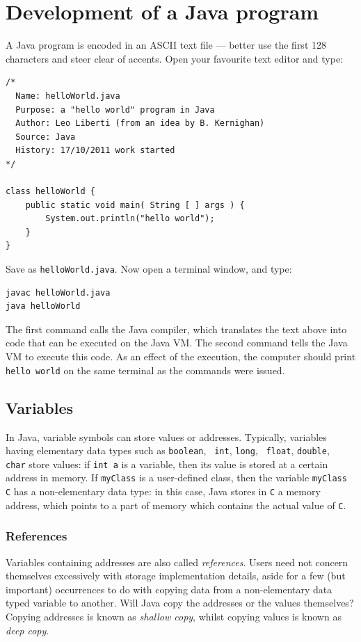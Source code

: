 \documentclass[a4paper]{book}
\theoremstyle{changebreak}                %
\begin{document}
\section{Development of a Java program}
\label{s:java:example}
A Java program is encoded in an ASCII text file ---
better use the first 128 characters and steer clear of accents. Open
your favourite text editor and type:
\begin{verbatim}
/*
  Name: helloWorld.java
  Purpose: a "hello world" program in Java
  Author: Leo Liberti (from an idea by B. Kernighan)
  Source: Java
  History: 17/10/2011 work started
*/

class helloWorld {
    public static void main( String [ ] args ) {
        System.out.println("hello world");
    }
}
\end{verbatim}
Save as {\tt helloWorld.java}. Now open a terminal window, and type:
\begin{verbatim}
javac helloWorld.java
java helloWorld
\end{verbatim}
The first command calls the Java compiler, which translates the text above into
code that can be executed on the Java VM. The second command tells the
Java VM to execute this code. As an effect of the execution, the
computer should print {\tt hello world} on the same terminal as the
commands were issued.

\subsection{Variables}
\label{s:java:variables}
In Java, variable symbols can store
values or addresses.
Typically, variables having elementary data
types such as {\tt boolean}, {\tt
  int}, {\tt long}, {\tt
  float}, {\tt double}, {\tt
  char} store values: if {\tt int a} is a variable,
then its value is stored at a certain address in
memory. If {\tt myClass} is a user-defined
class, then the variable {\tt myClass C} has
a non-elementary data type: in this case, Java stores
in {\tt C} a memory address, which points to a part of memory which
contains the actual value of {\tt C}.

\subsubsection{References}
Variables containing addresses are also called {\it
  references}. Users need not concern themselves
excessively with storage implementation details, aside for a few (but
important) occurrences to do with copying data from a non-elementary
data typed variable to another. Will Java copy the addresses or the
values themselves? Copying addresses is known as {\it shallow
  copy}, whilst copying values is known as {\it
  deep copy}.
\end{document}
